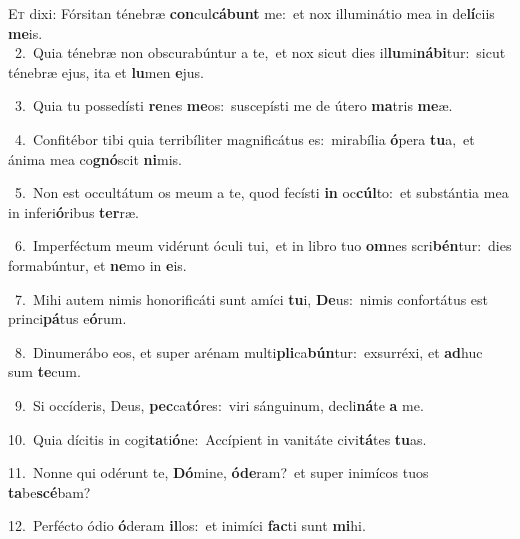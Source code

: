 \lettrine{\initial\textcolor{\initialcolor}{E}}{t} dixi: Fórsitan ténebræ \textbf{con}\-cul\-\textbf{cá}\-\textbf{bunt} me:~\star et nox illuminátio mea in de\-\textbf{lí}\-ciis \textbf{me}\-is.\\
{\numbfont\textcolor{\numbcolor}{~2.}}~Quia ténebræ non obscurabúntur a te,~\dagger et nox sicut dies il\-\textbf{lu}\-mi\-\textbf{ná}\-\textbf{bi}tur:~\star sicut ténebræ ejus, ita et \textbf{lu}\-men \textbf{e}\-jus.\par
{\numbfont\textcolor{\numbcolor}{~3.}}~Quia tu possedísti \textbf{re}\-nes \textbf{me}\-os:~\star suscepísti me de útero \textbf{ma}\-tris \textbf{me}\-æ.\par
{\numbfont\textcolor{\numbcolor}{~4.}}~Confitébor tibi quia terribíliter magnificátus es:~\dagger mirabília \textbf{ó}\-pera \textbf{tu}\-a,~\star et ánima mea co\-\textbf{gnó}\-scit \textbf{ni}\-mis.\par
{\numbfont\textcolor{\numbcolor}{~5.}}~Non est occultátum os meum a te, quod fecísti \textbf{in} oc\-\textbf{cúl}\-to:~\star et substántia mea in inferi\-\textbf{ó}\-ribus \textbf{ter}\-ræ.\par
{\numbfont\textcolor{\numbcolor}{~6.}}~Imperféctum meum vidérunt óculi tui,~\dagger et in libro tuo \textbf{om}\-nes scri\-\textbf{bén}\-tur:~\star dies formabúntur, et \textbf{ne}\-mo in \textbf{e}\-is.\par
{\numbfont\textcolor{\numbcolor}{~7.}}~Mihi autem nimis honorificáti sunt amíci \textbf{tu}\-i, \textbf{De}\-us:~\star nimis confortátus est princi\-\textbf{pá}\-tus e\-\textbf{ó}\-rum.\par
{\numbfont\textcolor{\numbcolor}{~8.}}~Dinumerábo eos, et super arénam multi\-\textbf{pli}\-ca\-\textbf{bún}\-tur:~\star exsurréxi, et \textbf{ad}\-huc sum \textbf{te}\-cum.\par
{\numbfont\textcolor{\numbcolor}{~9.}}~Si occíderis, Deus, \textbf{pec}\-ca\-\textbf{tó}\-res:~\star viri sánguinum, decli\-\textbf{ná}\-te \textbf{a} me.\par
{\numbfont\textcolor{\numbcolor}{10.}}~Quia dícitis in cogi\-\textbf{ta}\-ti\-\textbf{ó}\-ne:~\star Accípient in vanitáte civi\-\textbf{tá}\-tes \textbf{tu}\-as.\par
{\numbfont\textcolor{\numbcolor}{11.}}~Nonne qui odérunt te, \textbf{Dó}\-mine, \textbf{ó}\-\textbf{de}ram?~\star et super inimícos tuos \textbf{ta}\-be\-\textbf{scé}\-bam?\par
{\numbfont\textcolor{\numbcolor}{12.}}~Perfécto ódio \textbf{ó}\-deram \textbf{il}\-los:~\star et inimíci \textbf{fac}\-ti sunt \textbf{mi}\-hi.\par
